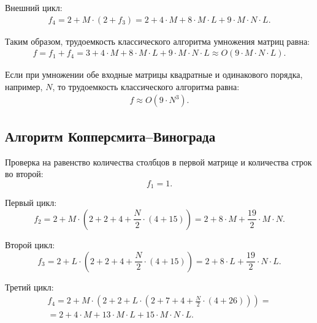 Внешний цикл:
\begin{equation}
\begin{gathered}
f_4 = 2 + M \cdot (2 + f_3) = 2 + 4 \cdot M + 8 \cdot M \cdot L + 9 \cdot M \cdot N \cdot L.
\end{gathered}
\end{equation}

Таким образом, трудоемкость классического алгоритма умножения матриц равна:
\begin{equation}
\begin{gathered}
f = f_1 + f_4 = 3 + 4 \cdot M + 8 \cdot M \cdot L + 9 \cdot M \cdot N \cdot L \approx O(9 \cdot M \cdot N \cdot L).
\end{gathered}
\end{equation}

Если при умножении обе входные матрицы квадратные и одинакового порядка, например, $N$, то трудоемкость классического алгоритма равна:
\begin{equation}
\begin{gathered}
f \approx O(9 \cdot N^3).
\end{gathered}
\end{equation}

\subsection{Алгоритм Копперсмита--Винограда}

Проверка на равенство количества столбцов в первой матрице и количества строк во второй:
\begin{equation}
f_1 = 1.
\end{equation}

Первый цикл:
\begin{equation}
f_2 = 2 + M \cdot (2 + 2 + 4 + \frac{N}{2} \cdot (4 + 15)) = 2 + 8 \cdot M + \frac{19}{2} \cdot M \cdot N.
\end{equation}

Второй цикл:
\begin{equation}
f_3 = 2 + L \cdot (2 + 2 + 4 + \frac{N}{2} \cdot (4 + 15)) = 2 + 8 \cdot L + \frac{19}{2} \cdot N \cdot L.
\end{equation}

Третий цикл:
\begin{equation}
\begin{gathered}
f_4 = 2 + M \cdot (2 + 2 + L \cdot (2 + 7 + 4 + \frac{N}{2} \cdot (4 + 26))) = \\ = 2 + 4 \cdot M + 13 \cdot M \cdot L + 15 \cdot M \cdot N \cdot L.
\end{gathered}
\end{equation}

